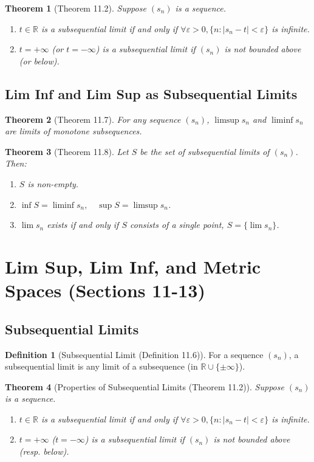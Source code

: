 \documentclass[9pt]{article}
\theoremstyle{definition}
\newtheorem{definition}{Definition}
\theoremstyle{plain}
\newtheorem{theorem}{Theorem}
\begin{document}
\begin{theorem}[Theorem 11.2]
Suppose $ (s_n) $ is a sequence.
\begin{enumerate}
    \item $ t \in \mathbb{R} $ is a subsequential limit if and only if $ \forall \varepsilon > 0, \{n : |s_n - t| < \varepsilon\} $ is infinite.
    \item $ t = +\infty $ (or $ t = -\infty $) is a subsequential limit if $ (s_n) $ is not bounded above (or below).
\end{enumerate}
\end{theorem}

\subsection*{Lim Inf and Lim Sup as Subsequential Limits}
\begin{theorem}[Theorem 11.7]
For any sequence $ (s_n) $, $ \limsup s_n $ and $ \liminf s_n $ are limits of monotone subsequences.
\end{theorem}

\begin{theorem}[Theorem 11.8]
Let $ S $ be the set of subsequential limits of $ (s_n) $. Then:
\begin{enumerate}
    \item $ S $ is non-empty.
    \item $ \inf S = \liminf s_n, \quad \sup S = \limsup s_n $.
    \item $ \lim s_n $ exists if and only if $ S $ consists of a single point, $ S = \{\lim s_n\} $.
\end{enumerate}
\end{theorem}
\section*{Lim Sup, Lim Inf, and Metric Spaces (Sections 11-13)}

\subsection*{Subsequential Limits}
\begin{definition}[Subsequential Limit (Definition 11.6)]
For a sequence $ (s_n) $, a subsequential limit is any limit of a subsequence (in $ \mathbb{R} \cup \{\pm\infty\} $).
\end{definition}

\begin{theorem}[Properties of Subsequential Limits (Theorem 11.2)]
Suppose $ (s_n) $ is a sequence.
\begin{enumerate}
    \item $ t \in \mathbb{R} $ is a subsequential limit if and only if $ \forall \varepsilon > 0, \{n : |s_n - t| < \varepsilon\} $ is infinite.
    \item $ t = +\infty $ ($ t = -\infty $) is a subsequential limit if $ (s_n) $ is not bounded above (resp. below).
\end{enumerate}
\end{theorem}
\end{document}
